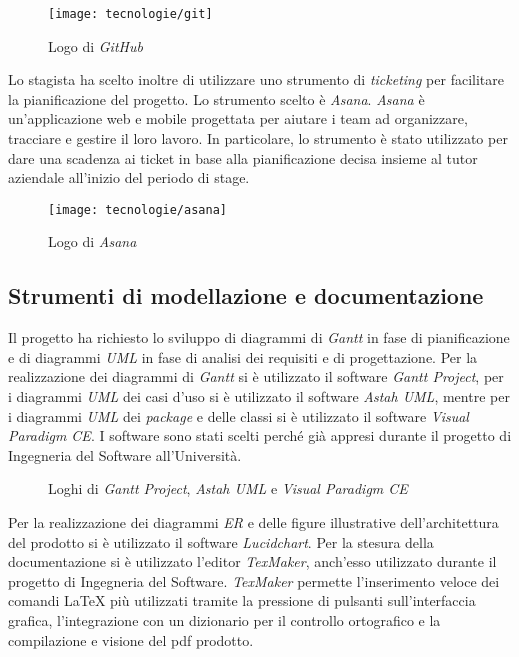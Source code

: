 \begin{figure}[!h] 
    \centering 
    \texttt{[image: tecnologie/git]} 
    \caption{Logo di \textit{GitHub}}
\end{figure}

Lo stagista ha scelto inoltre di utilizzare uno strumento di \textit{ticketing} per facilitare la pianificazione del progetto. Lo strumento scelto è \textit{Asana}. \textit{Asana} è un'applicazione web e mobile progettata per aiutare i team ad organizzare, tracciare e gestire il loro lavoro. In particolare, lo strumento è stato utilizzato per dare una scadenza ai ticket in base alla pianificazione decisa insieme al tutor aziendale all'inizio del periodo di stage.

\begin{figure}[!h] 
    \centering 
    \texttt{[image: tecnologie/asana]} 
    \caption{Logo di \textit{Asana}}
\end{figure}

\subsection{Strumenti di modellazione e documentazione}

Il progetto ha richiesto lo sviluppo di diagrammi di \textit{Gantt} in fase di pianificazione e di diagrammi \textit{UML} in fase di analisi dei requisiti e di progettazione. Per la realizzazione dei diagrammi di \textit{Gantt} si è utilizzato il software \textit{Gantt Project}, per i diagrammi \textit{UML} dei casi d'uso si è utilizzato il software \textit{Astah UML}, mentre per i diagrammi \textit{UML} dei \textit{package} e delle classi si è utilizzato il software \textit{Visual Paradigm CE}. I software sono stati scelti perché già appresi durante il progetto di Ingegneria del Software all'Università.

\begin{figure}[!h] 
    \centering 
    \caption{Loghi di \textit{Gantt Project}, \textit{Astah UML} e \textit{Visual Paradigm CE}}
\end{figure}

Per la realizzazione dei diagrammi \textit{ER} e delle figure illustrative dell'architettura del prodotto si è utilizzato il software \textit{Lucidchart}. Per la stesura della documentazione si è utilizzato l'editor \textit{TexMaker}, anch'esso utilizzato durante il progetto di Ingegneria del Software. \textit{TexMaker} permette l'inserimento veloce dei comandi \LaTeX{} più utilizzati tramite la pressione di pulsanti sull'interfaccia grafica, l'integrazione con un dizionario per il controllo ortografico e la compilazione e visione del pdf prodotto.

